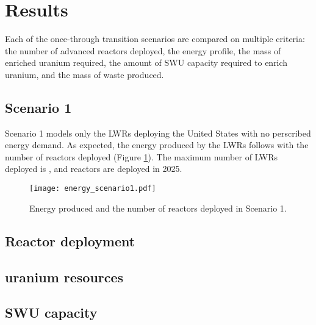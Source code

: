 \section{Results}
Each of the once-through transition scenarios are compared on multiple 
criteria: the number of advanced reactors deployed, the energy profile, 
the mass of enriched 
uranium required, the amount of \gls{SWU} capacity required to enrich uranium,
and the mass of waste produced. 

\subsection{Scenario 1}
Scenario 1 models only the \glspl{LWR} deploying the United States with no 
perscribed energy demand. As expected, the energy 
produced by the \glspl{LWR} follows with the number of reactors deployed
(Figure \ref{fig:energy1}). The maximum number of \glspl{LWR} deployed is 
, and reactors are deployed in 2025. 

\begin{figure}
    \centering
    \texttt{[image: energy\_scenario1.pdf]}
    \caption{Energy produced and the number of reactors deployed in Scenario 1.}
    \label{fig:energy1}
\end{figure}

\subsection{Reactor deployment}

\subsection{uranium resources}

\subsection{SWU capacity}